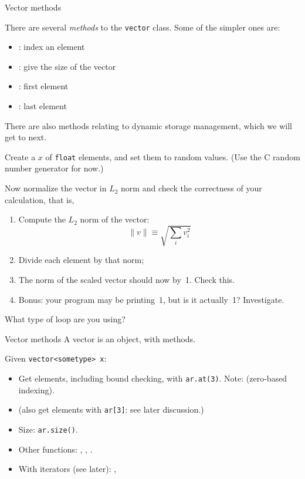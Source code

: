  {Vector methods}

There are several \emph{methods}
to the \lstinline{vector} class. Some of the simpler ones are:
\begin{itemize}
\item {}: index an element
\item {}: give the size of the vector
\item {}: first element
\item {}: last element
\end{itemize}

There are also methods relating to dynamic storage management, which
we will get to next.

\begin{exercise}
  \label{ex:vectornormalize}
  Create a  $x$ of \lstinline{float} elements, and set them to random
  values. (Use the C random number generator for now.)

  Now normalize the vector in $L_2$ norm and check the correctness of
  your calculation, that is,
  \begin{enumerate}
  \item Compute the $L_2$ norm of the vector:
    \[ \| v\| \equiv \sqrt{\sum_iv_i^2} \]
  \item Divide each element by that norm;
  \item The norm of the scaled vector should now by~1. Check this.
  \item Bonus: your program may be printing~1, but is it actually~1?
    Investigate.
  \end{enumerate}
  What type of loop are you using?
\end{exercise}


\begin{slide}{Vector methods}
  \label{sl:vector-method}
  A vector is an object, with methods.

  Given \lstinline+vector<sometype> x+:
  \begin{itemize}
  \item Get elements, including bound checking, with
    \lstinline{ar.at(3)}.
    Note: (zero-based indexing).
  \item (also get elements with \lstinline{ar[3]}: see later discussion.)
  \item Size: \lstinline{ar.size()}.
  \item Other functions: , , .
  \item With iterators (see later): , 
  \end{itemize}
\end{slide}

